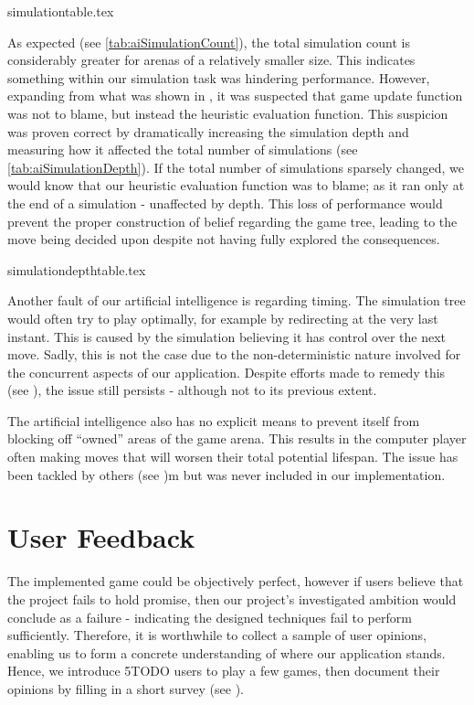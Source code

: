 \documentclass{standalone}
\begin{document}
		{simulationtable.tex}

	 	As expected (see \autoref{tab:aiSimulationCount}), the total simulation count is considerably greater for arenas of a relatively smaller size. This indicates something within our simulation task was hindering performance. However, expanding from what was shown in , it was suspected that game update function was not to blame, but instead the heuristic evaluation function. This suspicion was proven correct by dramatically increasing the simulation depth and measuring how it affected the total number of simulations (see \autoref{tab:aiSimulationDepth}). If the total number of simulations sparsely changed, we would know that our heuristic evaluation function was to blame; as it ran only at the end of a simulation - unaffected by depth. This loss of performance would prevent the proper construction of belief regarding the game tree, leading to the move being decided upon despite not having fully explored the consequences.

		{simulationdepthtable.tex}

		Another fault of our artificial intelligence is regarding timing. The simulation tree would often try to play optimally, for example by redirecting at the very last instant. This is caused by the simulation believing it has control over the next move. Sadly, this is not the case due to the non-deterministic nature involved for the concurrent aspects of our application. Despite efforts made to remedy this (see ), the issue still persists - although not to its previous extent.

		The artificial intelligence also has no explicit means to prevent itself from blocking off \enquote{owned} areas of the game arena. This results in the computer player often making moves that will worsen their total potential lifespan. The issue has been tackled by others (see \label{sec:background-google-ai})m but was never included in our implementation.

	\section{User Feedback} \label{sec:userFeedback}
		The implemented game could be objectively perfect, however if users believe that the project fails to hold promise, then our project's investigated ambition would conclude as a failure - indicating the designed techniques fail to perform sufficiently. Therefore, it is worthwhile to collect a sample of user opinions, enabling us to form a concrete understanding of where our application stands. Hence, we introduce 5TODO users to play a few games, then document their opinions by filling in a short survey (see ).
\end{document}
